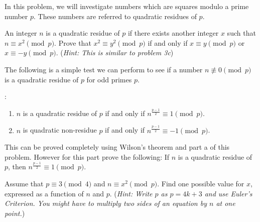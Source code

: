 \documentclass[12pt,twoside]{article}
\newcommand{\hint}[1]{({\it Hint: #1})}
\begin{document}
\begin{problem}{20} In this problem, we will investigate numbers which are squares modulo a prime number $p$.  These numbers are referred to quadratic residues of $p$.

\bparts

 An integer $n$ is a quadratic residue of $p$ if there exists another integer $x$ such that $n \equiv x^2  \pmod p$. Prove that $x^2 \equiv y^2 \pmod p$ if and only if $x \equiv y \pmod p$ or $x \equiv -y \pmod p$.
\hint{This is similar to problem 3c}


 The following is a simple test we can perform to see if a number $n \not\equiv 0 \pmod p$ is a quadratic residue of $p$ for odd primes $p$. 
\begin{theorem}
:
\begin{enumerate}
\item $n$ is a quadratic residue of $p$ if and only if $n^{\frac{p-1}{2}} \equiv 1 \pmod p$.
\item $n$ is quadratic non-residue $p$ if and only if $n^{\frac{p-1}{2}} \equiv -1 \pmod p$.
\end{enumerate} 
\end{theorem}

This can be proved completely using Wilson's theorem and part a of this problem.  However for this part prove the following:
If $n$ is a quadratic residue of $p$, then $n^{\frac{p-1}{2}} \equiv 1 \pmod p$.


Assume that $p \equiv 3 \pmod 4$ and $n \equiv x^2 \pmod p$. Find one possible value for $x$, expressed as a function of $n$ and $p$. 
\hint{Write $p$ as $p=4k+3$ and use Euler's Criterion. You might have to multiply two sides of an equation by $n$ at one point.}


\eparts

\end{problem}
\end{document}
